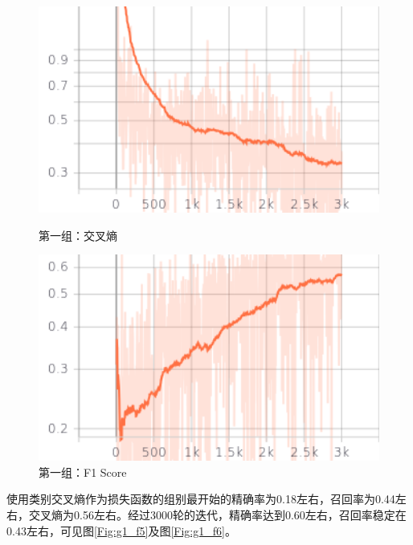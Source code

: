 \begin{figure}[htbp]
    
    \centering
    \begin{minipage}[t]{0.49\textwidth}
        \centering
        \includegraphics[width=1\textwidth]{Figures/图表/交叉熵/cross_entropy.png}
        \caption{第一组：交叉熵}
        \label{Fig:g1_f3}
    \end{minipage}
    \begin{minipage}[t]{0.49\textwidth}
        \centering
        \includegraphics[width=1\textwidth]{Figures/图表/交叉熵/f1_score.png}
        \caption{第一组：F1 Score}
        \label{Fig:g1_f4}
    \end{minipage}
    
\end{figure}

使用类别交叉熵作为损失函数的组别最开始的精确率为0.18左右，召回率为0.44左右，交叉熵为0.56左右。经过3000轮的迭代，精确率达到0.60左右，召回率稳定在0.43左右，可见图\ref{Fig:g1_f5}及图\ref{Fig:g1_f6}。

